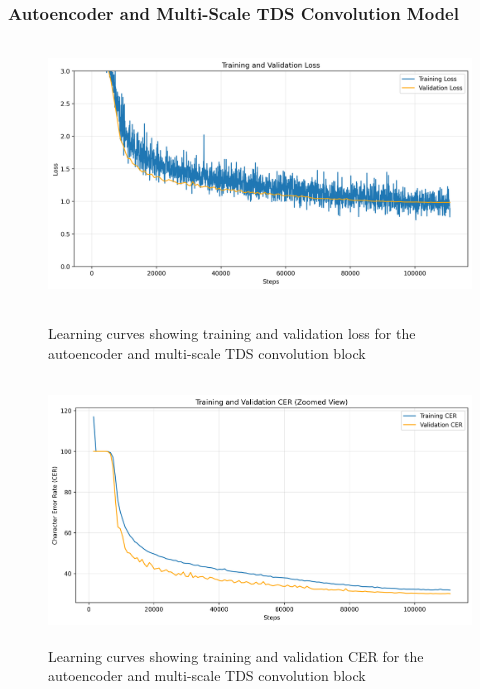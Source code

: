 \subsubsection{Autoencoder and Multi-Scale TDS Convolution Model}
\begin{figure}[H]
    \centering
    \begin{minipage}{0.48\textwidth}
        \centering
        \includegraphics[height=7cm,width=\textwidth]{../results/model-multi-scale-autoencoder-tiny/loss_plot.png}
        \caption{Learning curves showing training and validation loss for the autoencoder and multi-scale TDS convolution block}
        \label{fig:autoencoder_multi_scale_loss}
    \end{minipage}
    \hfill
    \begin{minipage}{0.48\textwidth}
        \centering
        \includegraphics[height=7cm, width=\textwidth]{../results/model-multi-scale-autoencoder-tiny/cer_zoomed_plot.png}
        \caption{Learning curves showing training and validation CER for the autoencoder and multi-scale TDS convolution block}
        \label{fig:autoencoder_multi_scale_cer}
    \end{minipage}
\end{figure}
